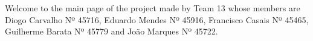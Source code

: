 Welcome to the main page of the project made by Team 13 whose members are Diogo Carvalho Nº 45716, Eduardo Mendes Nº 45916, Francisco Casais Nº 45465, Guilherme Barata Nº 45779 and João Marques Nº 45722. 